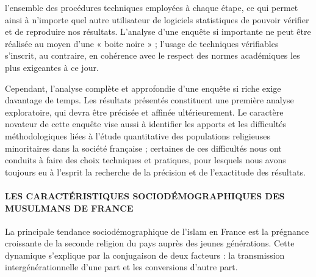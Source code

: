 l'ensemble des procédures techniques employées à chaque étape, ce qui
permet ainsi à n'importe quel autre utilisateur de logiciels
statistiques de pouvoir vérifier et de reproduire nos résultats.
L'analyse d'une enquête si importante ne peut être réalisée au moyen
d'une « boite noire » ; l'usage de techniques vérifiables s'inscrit, au
contraire, en cohérence avec le respect des normes académiques les plus
exigeantes à ce jour.

Cependant, l'analyse complète et approfondie d'une enquête si riche
exige davantage de temps. Les résultats présentés constituent une
première analyse exploratoire, qui devra être précisée et affinée
ultérieurement. Le caractère novateur de cette enquête vise aussi à
identifier les apports et les difficultés méthodologiques liées à
l'étude quantitative des populations religieuses minoritaires dans la
société française ; certaines de ces difficultés nous ont conduits à
faire des choix techniques et pratiques, pour lesquels nous avons
toujours eu à l'esprit la recherche de la précision et de l'exactitude
des résultats.


\hypertarget{les-caractuxe9ristiques-socioduxe9mographiques-des-musulmans-de-france}{%
\paragraph{LES CARACTÉRISTIQUES SOCIODÉMOGRAPHIQUES DES MUSULMANS DE
FRANCE}\label{les-caractuxe9ristiques-socioduxe9mographiques-des-musulmans-de-france}}


La principale tendance sociodémographique de l'islam en France est la
prégnance croissante de la seconde religion du pays auprès des jeunes
générations. Cette dynamique s'explique par la conjugaison de deux
facteurs : la transmission intergénérationnelle d'une part et les
conversions d'autre part.



